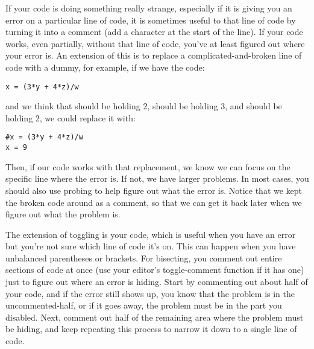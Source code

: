 \documentclass{handout}
\begin{document}
If your code is doing something really strange, especially if it is giving you an error on a particular line of code, it is sometimes useful to  that line of code by turning it into a comment (add a \code{#} character at the start of the line). If your code works, even partially, without that line of code, you've at least figured out where your error is. An extension of this is to replace a complicated-and-broken line of code with a dummy, for example, if we have the code:

\begin{lstlisting}
x = (3*y + 4*z)/w
\end{lstlisting}

and we think that  should be holding 2,  should be holding 3, and  should be holding 2, we could replace it with:

\begin{lstlisting}
#x = (3*y + 4*z)/w
x = 9
\end{lstlisting}

Then, if our code works with that replacement, we know we can focus on the specific line where the error is. If not, we have larger problems. In most cases, you should also use probing to help figure out what the error is. Notice that we kept the broken code around as a comment, so that we can get it back later when we figure out what the problem is.


The extension of toggling is  your code, which is useful when you have an error but you're not sure which line of code it's on. This can happen when you have unbalanced parentheses or brackets. For bisecting, you comment out entire sections of code at once (use your editor's toggle-comment function if it has one) just to figure out where an error is hiding. Start by commenting out about half of your code, and if the error still shows up, you know that the problem is in the uncommented-half, or if it goes away, the problem must be in the part you disabled. Next, comment out half of the remaining area where the problem must be hiding, and keep repeating this process to narrow it down to a single line of code.

\end{document}
